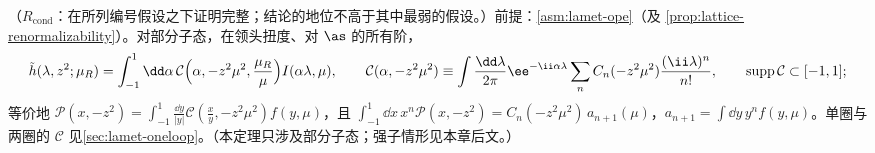 \begin{theorem}\label{thm:lamet-coordinate}
（$R_{\mathrm{cond}}$：在所列编号假设之下证明完整；结论的地位不高于其中最弱的假设。）前提：\cref{asm:lamet-ope}（及 \cref{prop:lattice-renormalizability}）。对部分子态，在领头扭度、对 $\as$ 的所有阶，
\begin{equation}\label{eq:lamet-coord-fact}
\tilde h(\lambda,z^2;\mu_R)=\int_{-1}^1\dd\alpha\,\mathcal C\Big(\alpha,-z^2\mu^2,\frac{\mu_R}\mu\Big)I(\alpha\lambda,\mu),\qquad
\mathcal C(\alpha,-z^2\mu^2)\equiv\int\frac{\dd\lambda}{2\pi}\ee^{-\ii\alpha\lambda}\sum_nC_n(-z^2\mu^2)\frac{(\ii\lambda)^n}{n!},\qquad{\rm supp}\,\mathcal C\subset[-1,1];
\end{equation}%
等价地 $\mathcal P(x,-z^2)=\int_{-1}^1\frac{\dd y}{|y|}\mathcal C(\frac xy,-z^2\mu^2)f(y,\mu)$，且 $\int_{-1}^1\dd x\,x^n\mathcal P(x,-z^2)=C_n(-z^2\mu^2)\,a_{n+1}(\mu)$，$a_{n+1}=\int\dd y\,y^nf(y,\mu)$。单圈与两圈的 $\mathcal C$ 见\cref{sec:lamet-oneloop}。（本定理只涉及部分子态；强子情形见本章后文。）
\end{theorem}

